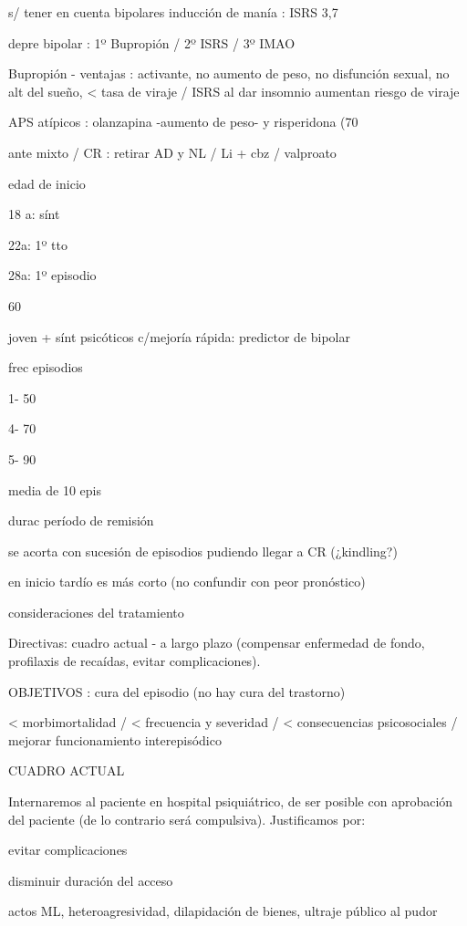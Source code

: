 s/ tener en cuenta bipolares inducción de manía : ISRS 3,7%

depre bipolar : 1º Bupropión / 2º ISRS / 3º IMAO

Bupropión - ventajas : activante, no aumento de peso, no disfunción sexual, no alt del sueño, < tasa de viraje / ISRS al dar insomnio aumentan riesgo de viraje

APS atípicos : olanzapina -aumento de peso- y risperidona (70%

ante mixto / CR : retirar AD y NL / Li + cbz / valproato

edad de inicio

18 a: sínt

22a: 1º tto

28a: 1º episodio

60%

joven + sínt psicóticos c/mejoría rápida: predictor de bipolar

frec episodios

1- 50%

4- 70%

5- 90%

media de 10 epis

durac período de remisión

se acorta con sucesión de episodios pudiendo llegar a CR (¿kindling?)

en inicio tardío es más corto (no confundir con peor pronóstico)

consideraciones del tratamiento

Directivas: cuadro actual - a largo plazo (compensar enfermedad de fondo, profilaxis de recaídas, evitar complicaciones).

OBJETIVOS : cura del episodio (no hay cura del trastorno)

< morbimortalidad / < frecuencia y severidad / < consecuencias psicosociales / mejorar funcionamiento interepisódico

CUADRO ACTUAL

Internaremos al paciente en hospital psiquiátrico, de ser posible con aprobación del paciente (de lo contrario será compulsiva). Justificamos por:

evitar complicaciones

disminuir duración del acceso

actos ML, heteroagresividad, dilapidación de bienes, ultraje público al pudor

